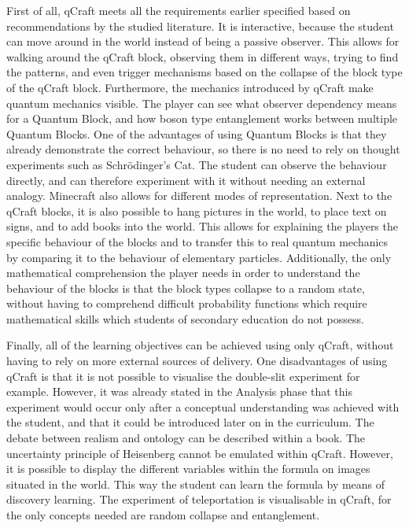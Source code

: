 \documentclass[11pt,twoside]{report} %
\begin{document}
First of all, qCraft meets all the requirements earlier specified based on recommendations by the studied literature. It is interactive, because the student can move around in the world instead of being a passive observer. This allows for walking around the qCraft block, observing them in different ways, trying to find the patterns, and even trigger mechanisms based on the collapse of the block type of the qCraft block. Furthermore, the mechanics introduced by qCraft make quantum mechanics visible. The player can see what observer dependency means for a Quantum Block, and how boson type entanglement works between multiple Quantum Blocks. One of the advantages of using Quantum Blocks is that they already demonstrate the correct behaviour, so there is no need to rely on thought experiments such as Schrödinger's Cat. The student can observe the behaviour directly, and can therefore experiment with it without needing an external analogy. Minecraft also allows for different modes of representation. Next to the qCraft blocks, it is also possible to hang pictures in the world, to place text on signs, and to add books into the world. This allows for explaining the players the specific behaviour of the blocks and to transfer this to real quantum mechanics by comparing it to the behaviour of elementary particles. Additionally, the only mathematical comprehension the player needs in order to understand the behaviour of the blocks is that the block types collapse to a random state, without having to comprehend difficult probability functions which require mathematical skills which students of secondary education do not possess.

Finally, all of the learning objectives can be achieved using only qCraft, without having to rely on more external sources of delivery. One disadvantages of using qCraft is that it is not possible to visualise the double-slit experiment for example. However, it was already stated in the Analysis phase that this experiment would occur only after a conceptual understanding was achieved with the student, and that it could be introduced later on in the curriculum. The debate between realism and ontology can be described within a book. The uncertainty principle of Heisenberg cannot be emulated within qCraft. However, it is possible to display the different variables within the formula on images situated in the world. This way the student can learn the formula by means of discovery learning. The experiment of teleportation is visualisable in qCraft, for the only concepts needed are random collapse and entanglement.
\end{document}
